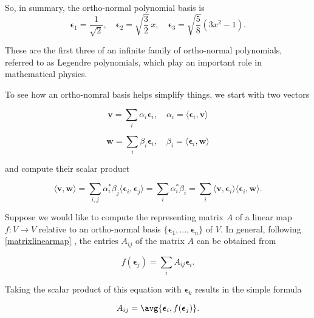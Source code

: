 \documentclass[a4paper,12pt]{report}
\begin{document}
So, in summary, the ortho-normal polynomial basis is
\begin{equation}
\boldsymbol{\epsilon}_1 = \frac{1}{\sqrt{2}}, \quad \boldsymbol{\epsilon}_2 = \sqrt{\frac{3}{2}} \, x, \quad \boldsymbol{\epsilon}_3 = \sqrt{\frac{5}{8}} (3x^2 - 1).
\end{equation}

These are the first three of an infinite family of ortho-normal polynomials, referred to as Legendre polynomials, which play an important role in mathematical physics.

To see how an ortho-nomral basis helps simplify things, we start with two vectors 

\begin{equation}
    \mathbf{v} = \sum_i \alpha_i \boldsymbol{\epsilon}_i, \quad \alpha_i = \langle \boldsymbol{\epsilon}_i, \mathbf{v} \rangle
\end{equation}

\begin{equation}
    \mathbf{w} = \sum_i \beta_i \boldsymbol{\epsilon}_i, \quad \beta_i = \langle \boldsymbol{\epsilon}_i, \mathbf{w} \rangle
\end{equation}

and compute their scalar product

\begin{equation}
    \langle \mathbf{v}, \mathbf{w} \rangle = \sum_{i,j} \alpha_i^* \beta_j \langle \boldsymbol{\epsilon}_i, \boldsymbol{\epsilon}_j \rangle = \sum_i \alpha_i^* \beta_i = \sum_i \langle \mathbf{v}, \boldsymbol{\epsilon}_i \rangle \langle \boldsymbol{\epsilon}_i, \mathbf{w} \rangle.
\end{equation}

Suppose we would like to compute the representing matrix $A$ of a linear map $f : V \to V$ relative to an ortho-normal basis $\{ \boldsymbol{\epsilon}_1, \ldots, \boldsymbol{\epsilon}_n \}$ of $V$. In general, following \cref{matrixlinearmap} , the entries $A_{ij}$ of the matrix $A$ can be obtained from

\begin{equation}
    f(\boldsymbol{\epsilon}_j) = \sum_i A_{ij} \boldsymbol{\epsilon}_i.
\end{equation}

Taking the scalar product of this equation with \(\boldsymbol{\epsilon } _{k} \) results in the simple formula

\begin{equation} \label{matricesentries} 
    A_{ij}= \avg{\boldsymbol{\epsilon } _{i}, f(\boldsymbol{\epsilon }_{j}  ) }.  
\end{equation}
\end{document}
